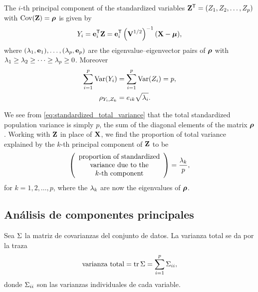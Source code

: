 \begin{theorem}
  \label{thm:pca_standardized}
  The $i$-th principal component of the standardized variables
  $\mathbf{Z}^{\mathsf{T}}=(Z_1,Z_2,\dots,Z_p)$ with $\operatorname{Cov}(\mathbf{Z})=\boldsymbol{\rho}$ is given by
  \begin{equation}
    \label{eq:pc_standardized}
    Y_i=\mathbf{e}_i^{\mathsf{T}}\mathbf{Z}
       =\mathbf{e}_i^{\mathsf{T}}\left( \mathbf{V}^{1/2} \right)^{-1}(\mathbf{X}-\boldsymbol{\mu}),
  \end{equation}
  where $(\lambda_1,\mathbf{e}_1),\dots,(\lambda_p,\mathbf{e}_p)$ are the
  eigenvalue--eigenvector pairs of $\boldsymbol{\rho}$ with
  $\lambda_1\ge\lambda_2\ge\dots\ge\lambda_p\ge0$. Moreover
  \begin{align}
    \sum_{i=1}^{p}\operatorname{Var}(Y_i)&=\sum_{i=1}^{p}\operatorname{Var}(Z_i)=p,
    \label{eq:standardized_total_variance}\\
    \rho_{Y_i,Z_k}&=e_{ik}\sqrt{\lambda_i}.
    \label{eq:corr_standardized}
  \end{align}
\end{theorem}

We see from \eqref{eq:standardized_total_variance} that the total standardized
population variance is simply $p$, the sum of the diagonal elements of the
matrix $\boldsymbol{\rho}$. Working with $\mathbf{Z}$ in place of $\mathbf{X}$, we find the
proportion of total variance explained by the $k$-th principal component of
$\mathbf{Z}$ to be
\begin{equation}
  \label{eq:proportion_standardized}
  \left( \begin{array}{c}
    \text{proportion of standardized}\\
    \text{variance due to the}\\
    \text{$k$-th component}
  \end{array} \right)
  =\frac{\lambda_k}{p},
\end{equation}
for $k=1,2,\dots,p$, where the $\lambda_k$ are now the eigenvalues of $\boldsymbol{\rho}$.

\subsection{An\'alisis de componentes principales}
\label{subsec:acp_espanol}

Sea $\Sigma$ la matriz de covarianzas del conjunto de datos. La varianza total se
da por la traza
\begin{equation}
  \label{eq:varianza_total_es}
  \text{varianza total}=\operatorname{tr}\Sigma=\sum_{i=1}^{p}\Sigma_{ii},
\end{equation}
donde $\Sigma_{ii}$ son las varianzas individuales de cada variable.

